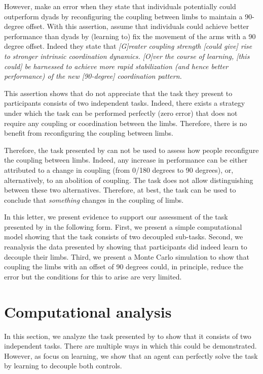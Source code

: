 \documentclass[11pt]{article}
\begin{document}
However, \citet{Annand2020} make an error when they state that individuals potentially could outperform dyads by reconfiguring the coupling between limbs to maintain a 90-degree offset. With this assertion, \citet{Annand2020} assume that individuals could achieve better performance than dyads by (learning to) fix the movement of the arms with a 90 degree offset. Indeed they state that \textit{[G]reater coupling strength [could give] rise to stronger intrinsic coordination dynamics. [O]ver the course of learning, [this could] be harnessed to achieve more rapid stabilization (and hence better performance) of the new [90-degree] coordination pattern.}

This assertion shows that \citet{Annand2020} do not appreciate that the task they present to participants consists of two independent tasks. Indeed, there exists a strategy under which the task can be performed perfectly (zero error) that does not require any coupling or coordination between the limbs. Therefore, there is no benefit from reconfiguring the coupling between limbs. 

Therefore, the task presented by \citet{Annand2020} can not be used to assess how people reconfigure the coupling between limbs. Indeed, any increase in performance can be either attributed to a change in coupling (from 0/180 degrees to 90 degrees), or, alternatively, to an abolition of coupling. The task does not allow distinguishing between these two alternatives. Therefore, at best, the task can be used to conclude that \textit{something} changes in the coupling of limbs. 

In this letter, we present evidence to support our assessment of the task presented by \citet{Annand2020} in the following form. First, we present a simple computational model showing that the task consists of two decoupled sub-tasks. Second, we reanalysis the data presented by \citet{Annand2020} showing that participants did indeed learn to decouple their limbs. Third, we present a Monte Carlo simulation to show that coupling the limbs with an offset of 90 degrees could, in principle, reduce the error but the conditions for this to arise are very limited.


\section{Computational analysis}

In this section, we analyze the task presented by \citet{Annand2020} to show that it consists of two independent tasks. There are multiple ways in which this could be demonstrated. However, as \citet{Annand2020} focus on learning, we show that an agent can perfectly solve the task by learning to decouple both controls.
\end{document}
